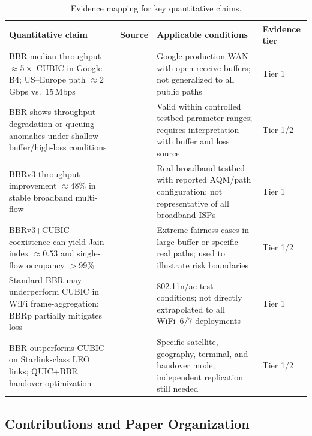 \documentclass[a4paper,fleqn]{cas-sc}
\begin{document}
\begin{table}[pos=tbp]
  \caption{Evidence mapping for key quantitative claims.}
  \label{tab:evidence_matrix}
  \small
  \begin{tabularx}{\tblwidth}{@{}p{4.2cm}p{2.8cm}Xp{1.5cm}@{}}
    \toprule
    \textbf{Quantitative claim} & \textbf{Source} & \textbf{Applicable conditions} & \textbf{Evidence tier} \\
    \midrule
    BBR median throughput $\approx\!5\times$ CUBIC in Google B4; US--Europe path $\approx$2\,Gbps vs.\ 15\,Mbps &
      \citet{cardwell2017bbr} &
      Google production WAN with open receive buffers; not generalized to all public paths &
      Tier 1 \\
    BBR shows throughput degradation or queuing anomalies under shallow-buffer/high-loss conditions &
      \citet{cao2019bbr,jaeger2019bbr} &
      Valid within controlled testbed parameter ranges; requires interpretation with buffer and loss source &
      Tier 1/2 \\
    BBRv3 throughput improvement $\approx\!48\%$ in stable broadband multi-flow &
      \citet{gomez2024bbrv3} &
      Real broadband testbed with reported AQM/path configuration; not representative of all broadband ISPs &
      Tier 1 \\
    BBRv3+CUBIC coexistence can yield Jain index $\approx\!0.53$ and single-flow occupancy $>$99\% &
      \citet{abrol2026bbr,zeynali2024bbrv3} &
      Extreme fairness cases in large-buffer or specific real paths; used to illustrate risk boundaries &
      Tier 1/2 \\
    Standard BBR may underperform CUBIC in WiFi frame-aggregation; BBRp partially mitigates loss &
      \citet{grazia2020bbrp} &
      802.11n/ac test conditions; not directly extrapolated to all WiFi~6/7 deployments &
      Tier 1 \\
    BBR outperforms CUBIC on Starlink-class LEO links; QUIC+BBR handover optimization &
      \citet{deutschmann2023starlink,kamel2024starquic} &
      Specific satellite, geography, terminal, and handover mode; independent replication still needed &
      Tier 1/2 \\
    \bottomrule
  \end{tabularx}
\end{table}

\subsection{Contributions and Paper Organization}
\label{sec:contrib}
\end{document}

